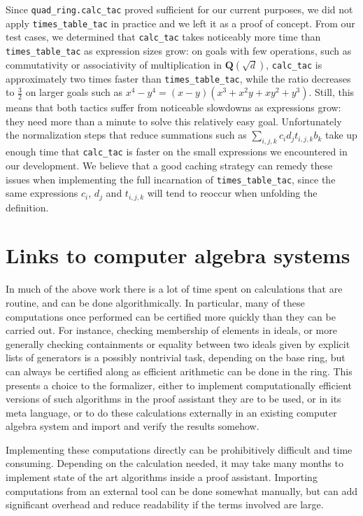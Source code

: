 \documentclass[sigplan,10pt,nonacm,
screen]{acmart} \settopmatter{printfolios=true,printccs=false,printacmref=false}
\newcommand{\QQ}{\mathbf{Q}}
\begin{document}
Since \lstinline{quad_ring.calc_tac} proved sufficient for our current purposes,
we did not apply \lstinline{times_table_tac} in practice and we left it as a proof of concept.
From our test cases, we determined that \lstinline{calc_tac} takes noticeably more time than \lstinline{times_table_tac} as expression sizes grow:
on goals with few operations, such as commutativity or associativity of multiplication in $\QQ(\sqrt{d})$,
\lstinline{calc_tac} is approximately two times faster than \lstinline{times_table_tac},
while the ratio decreases to $\frac{3}{2}$ on larger goals such as $x^4 - y^4 = (x - y) (x^3 + x^2 y + x y^2 + y^3)$.
Still, this means that both tactics suffer from noticeable slowdowns as expressions grow: they need more than a minute to solve this relatively easy goal.
Unfortunately the normalization steps that reduce summations such as $\sum_{i, j, k} c_i d_j t_{i, j, k} b_k$ take up enough time that \lstinline{calc_tac} is faster on the small expressions we encountered in our development.
We believe that a good caching strategy can remedy these issues when implementing the full incarnation of \lstinline{times_table_tac},
since the same expressions $c_i$, $d_j$ and $t_{i, j, k}$ will tend to reoccur when unfolding the definition.

\section{Links to computer algebra systems}\label{sec:Sageify}

In much of the above work there is a lot of time spent on calculations that are routine, and can be done algorithmically.
In particular, many of these computations once performed can be certified more quickly than they can be carried out.
For instance, checking membership of elements in ideals, or more generally checking containments or equality between two ideals given by explicit lists of generators is a possibly nontrivial task, depending on the base ring, but can always be certified along as efficient arithmetic can be done in the ring.
This presents a choice to the formalizer, either to implement computationally efficient versions of such algorithms in the proof assistant they are to be used, or in its meta language, or to do these calculations externally in an existing computer algebra system and import and verify the results somehow.

Implementing these computations directly can be prohibitively difficult and time consuming.
Depending on the calculation needed, it may take many months to implement state of the art algorithms inside a proof assistant.
Importing computations from an external tool can be done somewhat manually, but can add significant overhead and reduce readability if the terms involved are large.
\end{document}
